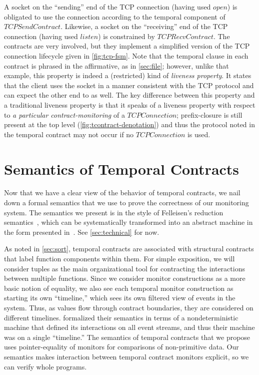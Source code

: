 \documentclass[preprint,onecolumn,9pt]{sigplanconf} %
\begin{document}
A socket on the ``sending'' end of the TCP connection (having used $open$) is obligated to use the connection according to the temporal component of $TCPSendContract$.
%
Likewise, a socket on the ``receiving'' end of the TCP connection (having used $listen$) is constrained by $TCPRecvContract$.
%
The contracts are very involved, but they implement a simplified version of the TCP connection lifecycle given in \autoref{fig:tcp-fsm}.
%
Note that the temporal clause in each contract is phrased in the affirmative, as in \autoref{sec:file}; however, unlike that example, this property is indeed a (restricted) kind of \emph{liveness property}.
%
It states that the client uses the socket in a manner consistent with the TCP protocol and can expect the other end to as well.
%
The key difference between this property and a traditional liveness property is that it speaks of a liveness property with respect to \emph{a particular contract-monitoring} of a $TCPConnection$; prefix-closure is still present at the top level (\autoref{fig:tcontract-denotation}) and thus the protocol noted in the temporal contract may not occur if no $TCPConnection$ is used.

\section{Semantics of Temporal Contracts} \label{sec:temporal-semantics}

Now that we have a clear view of the behavior of temporal contracts, we nail down a formal semantics that we use to prove the correctness of our monitoring system.
%
The semantics we present is in the style of Felleisen's reduction semantics~\citep{ianjohnson:Felleisen:2009:SEP:1795772}, which can be systematically transformed into an abstract machine in the form presented in~\citet{dvanhorn:VanHorn2010Abstracting}.
%
See \autoref{sec:technical} for now.

As noted in \autoref{sec:sort}, temporal contracts are associated with structural contracts that label function components within them.
%
For simple exposition, we will consider tuples as the main organizational tool for contracting the interactions between multiple functions.
%
Since we consider monitor constructions as a more basic notion of equality, we also see each temporal monitor construction as starting its own ``timeline,'' which sees its own filtered view of events in the system.
%
Thus, as values flow through contract boundaries, they are considered on different timelines.
%
\citeauthor{ianjohnson:dfm:icfp2011} formalized their semantics in terms of a nondeterministic machine that defined its interactions on all event streams, and thus their machine was on a single ``timeline.''
%
The semantics of temporal contracts that we propose uses pointer-equality of monitors for comparisons of non-primitive data.
%
Our semantics makes interaction between temporal contract monitors explicit, so we can verify whole programs.
\end{document}
